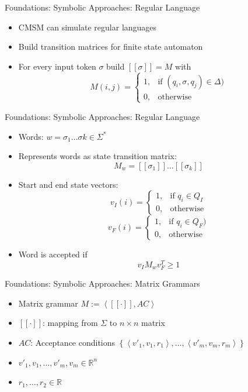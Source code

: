 \documentclass[12pt,a4paper]{beamer}
\newcommand{\tuple}[1]{\ensuremath{\left \langle #1 \right \rangle }}
\newcommand{\setof}[1]{\ensuremath{\left \{ #1 \right \}}}
\begin{document}
\begin{frame}{Foundations: Symbolic Approaches: Regular Language}
\begin{itemize}
\item CMSM can simulate regular languages
\item Build transition matrices for finite state automaton
\item For every input token $\sigma$ build $[[\sigma]] = M$ with
$$ M(i,j) = \left\{\begin{array}{cl} 1, & \mbox{if } (q_{i},\sigma,q_{j}) \in \Delta) \\ 0, & \mbox{otherwise} \end{array}\right.  $$
\end{itemize}
\end{frame}


\begin{frame}{Foundations: Symbolic Approaches: Regular Language}
\begin{itemize}
\item Words: $w = \sigma_{1} \ldots \sigma{k} \in \Sigma^{*}$ 
\item Represents words as state transition matrix:
$$ M_{w} = [[\sigma_{1}]]\ldots [[\sigma_{k}]]  $$
\item Start and end state vectors:
$$ v_{I}(i) = \left\{\begin{array}{cl} 1, & \mbox{if } q_{i} \in Q_{I} \\ 0, & \mbox{otherwise} \end{array}\right. $$ 
$$ v_{F}(i) = \left\{\begin{array}{cl} 1, & \mbox{if } q_{i} \in Q_{F}) \\ 0, & \mbox{otherwise} \end{array}\right. $$
\item Word is accepted if
$$ v_{I}M_{w}v_{F}^{T} \ge 1 $$
\end{itemize}
\end{frame}



\begin{frame}{Foundations: Symbolic Approaches: Matrix Grammars}
\begin{itemize}
\item Matrix grammar $M := \tuple{[[\mathord{\cdot}]], AC}$
\item $[[\mathord{\cdot}]]$: mapping from $\Sigma$ to $n \times n $ matrix
\item $AC$: Acceptance conditions $ \setof{ \tuple{v'_{1}, v_{1}, r_{1}}, \ldots, \tuple{v'_{m}, v_{m}, r_{m}} }$
\item $v'_{1}, v_{1},\ldots,v'_{m}, v_{m} \in \mathbb{R}^{n}$
\item $r_{1}, \ldots, r_{2} \in \mathbb{R}$
\end{itemize}
\end{frame}
\end{document}
